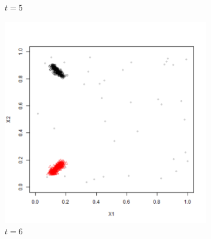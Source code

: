 \begin{figure}[!htb]
\begin{subfigure}[t]{0.25\textwidth}
                \caption{$t = 5$}
                \label{Fig:Benchmark1_14}
        \end{subfigure}%
		\qquad %
        \begin{subfigure}[t]{0.25\textwidth}
                \includegraphics[page=7,width=\textwidth]{figures/datasets/Benchmark1_5500}
                \caption{$t = 6$}
                \label{Fig:Benchmark1_15}
        \end{subfigure}%
        \qquad %
        \begin{subfigure}[t]{0.25\textwidth}

\end{subfigure}
\end{figure}
